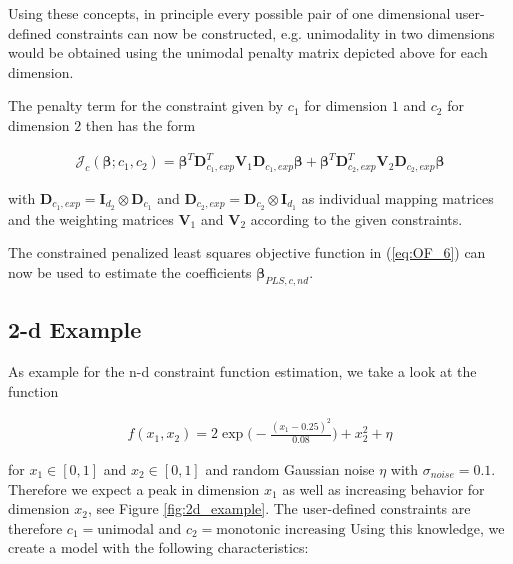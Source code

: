 \documentclass[10pt,a4paper]{article}
\begin{document}
	Using these concepts, in principle every possible pair of one dimensional user-defined constraints can now be constructed, e.g. unimodality in two dimensions would be obtained using the unimodal penalty matrix depicted above for each dimension. 
	
	The penalty term for the constraint given by $c_1$ for dimension $1$ and $c_2$ for dimension $2$ then has the form
	
	\begin{align} \label{eq:J_c_tps}
		\mathcal J_c(\boldsymbol{\beta}; c_1, c_2) = \boldsymbol{\beta}^T \boldsymbol{D}_{c_1,exp}^T \boldsymbol{V}_1 \boldsymbol{D}_{c_1,exp} \boldsymbol{\beta} + \boldsymbol{\beta}^T \boldsymbol{D}_{c_2,exp}^T \boldsymbol{V}_2 \boldsymbol{D}_{c_2,exp} \boldsymbol{\beta}
	\end{align}
	
	with $\boldsymbol{D}_{c_1,exp} = \boldsymbol{I}_{d_2} \otimes \boldsymbol{D}_{c_1}$ and $\boldsymbol{D}_{c_2,exp} = \boldsymbol{D}_{c_2} \otimes \boldsymbol{I}_{d_1}$ as individual mapping matrices  and the weighting matrices $\boldsymbol{V}_1$ and $\boldsymbol{V}_2$ according to the given constraints.
		
	The constrained penalized least squares objective function in (\ref{eq:OF_6}) can now be used to estimate the coefficients $\boldsymbol{\beta}_{PLS,c, nd}$. \cite{fahrmeir2013regression}
	
	\subsection{2-d Example}
	
	As example for the n-d constraint function estimation, we take a look at the function 
	
	\begin{align} \label{eq:2d_test_func}
		f(x_1, x_2) = 2\exp{\Big(-\frac{(x_1 - 0.25)^2}{0.08}\Big)} + x_2^2 + \eta
	\end{align}
	
	for $x_1 \in [0,1]$ and $x_2 \in [0,1]$ and random Gaussian noise $\eta$ with $\sigma_{noise} = 0.1$. Therefore we expect a peak in dimension $x_1$ as well as increasing behavior for dimension $x_2$, see Figure \ref{fig:2d_example}. The user-defined constraints are therefore $c_1 = \text{unimodal}$ and $c_2 = \text{monotonic increasing}$ Using this knowledge, we create a model with the following characteristics:
	
\end{document}
